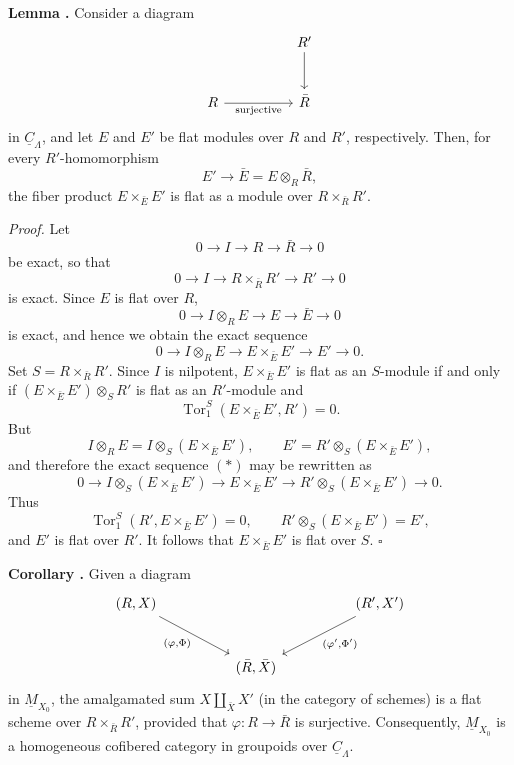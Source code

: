 
\medskip
\noindent\textbf{Lemma .}
Consider a diagram
\[
\begin{tikzcd}[column sep=huge,row sep=large]
& R' \arrow[d] \\
R \arrow[r,"\mathrm{surjective}"'] & \bar R
\end{tikzcd}
\]
in $\underline C_\Lambda$, and let $E$ and $E'$ be flat modules over
$R$ and $R'$, respectively. Then, for every $R'$-homomorphism
\[
 E'\longrightarrow \bar E=E\otimes_R\bar R,
\]
the fiber product $E\times_{\bar E}E'$ is flat as a module over
$R\times_{\bar R}R'$.


\medskip
\noindent\textit{Proof.}
Let
\[
 0\longrightarrow I\longrightarrow R\longrightarrow\bar R
 \longrightarrow0
\]
be exact, so that
\[
 0\longrightarrow I\longrightarrow R\times_{\bar R}R'
 \longrightarrow R'\longrightarrow0
\]
is exact. Since $E$ is flat over $R$,
\[
 0\longrightarrow I\otimes_RE\longrightarrow E
 \longrightarrow\bar E\longrightarrow0
\]
is exact, and hence we obtain the exact sequence
\begin{equation}\tag{*}
0\longrightarrow I\otimes_RE\longrightarrow
E\times_{\bar E}E'\longrightarrow E'\longrightarrow0.
\end{equation}
Set $S=R\times_{\bar R}R'$. Since $I$ is nilpotent,
$E\times_{\bar E}E'$ is flat as an $S$-module if and only if
$(E\times_{\bar E}E')\otimes_SR'$ is flat as an $R'$-module and
\[
 \operatorname{Tor}_1^S(E\times_{\bar E}E',R')=0.
\]
But
\[
 I\otimes_RE=I\otimes_S(E\times_{\bar E}E'),
 \qquad
 E'=R'\otimes_S(E\times_{\bar E}E'),
\]
and therefore the exact sequence $(*)$ may be rewritten as
\[
0\longrightarrow I\otimes_S(E\times_{\bar E}E')
\longrightarrow E\times_{\bar E}E'
\longrightarrow R'\otimes_S(E\times_{\bar E}E')
\longrightarrow0.
\]
Thus
\[
 \operatorname{Tor}_1^S(R',E\times_{\bar E}E')=0,
 \qquad
 R'\otimes_S(E\times_{\bar E}E')=E',
\]
and $E'$ is flat over $R'$. It follows that
$E\times_{\bar E}E'$ is flat over $S$. \hfill$\square$

\medskip
\noindent\textbf{Corollary .}
Given a diagram
\[
\begin{tikzcd}[column sep=huge,row sep=large]
(R,X) \arrow[dr,"{(\varphi,\Phi)}"']
&& (R',X') \arrow[dl,"{(\varphi',\Phi')}"] \\
& (\bar R,\bar X) &
\end{tikzcd}
\]
in $\underline M_{X_0}$, the amalgamated sum
$X\amalg_{\bar X}X'$ (in the category of schemes) is a flat scheme
over $R\times_{\bar R}R'$, provided that
$\varphi:R\longrightarrow\bar R$ is surjective. Consequently,
$\underline M_{X_0}$ is a homogeneous cofibered category in groupoids
over $\underline C_\Lambda$.

